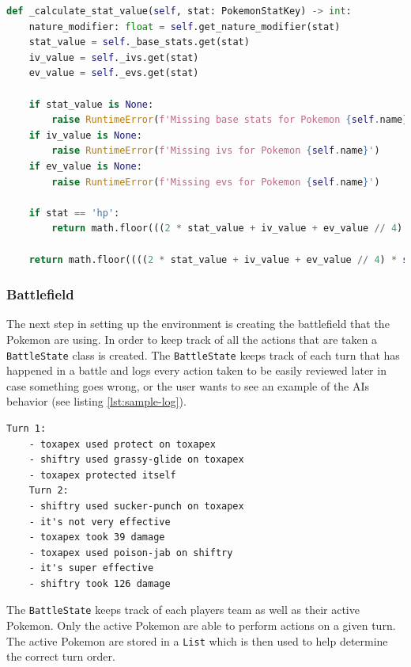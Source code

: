 \begin{lstlisting}[language=Python,caption={Function for calculating a Pokemon's stats},float=h,label=lst:stat-calc,breaklines]
def _calculate_stat_value(self, stat: PokemonStatKey) -> int:
    nature_modifier: float = self.get_nature_modifier(stat)
    stat_value = self._base_stats.get(stat)
    iv_value = self._ivs.get(stat)
    ev_value = self._evs.get(stat)

    if stat_value is None:
        raise RuntimeError(f'Missing base stats for Pokemon {self.name}')
    if iv_value is None:
        raise RuntimeError(f'Missing ivs for Pokemon {self.name}')
    if ev_value is None:
        raise RuntimeError(f'Missing evs for Pokemon {self.name}')

    if stat == 'hp':
        return math.floor(((2 * stat_value + iv_value + ev_value // 4) * self.level // 100) + self.level + 10)

    return math.floor((((2 * stat_value + iv_value + ev_value // 4) * self.level // 100) + 5) * nature_modifier)
\end{lstlisting}

\subsubsection{Battlefield}
The next step in setting up the environment is creating the battlefield that the Pokemon are using. In order to keep track
of all the actions that are taken a \lstinline|BattleState| class is created. The \lstinline|BattleState| keeps track of
each turn that has happened in a battle and logs every action taken to be easily reviewed later in case something goes wrong,
or the user wants to see an example of the AIs behavior (see listing \ref{lst:sample-log}).
\begin{lstlisting}[caption={Sample log from an episode},float=h,label=lst:sample-log,breaklines]
    Turn 1:
    - toxapex used protect on toxapex
    - shiftry used grassy-glide on toxapex
    - toxapex protected itself
    Turn 2:
    - shiftry used sucker-punch on toxapex
    - it's not very effective
    - toxapex took 39 damage
    - toxapex used poison-jab on shiftry
    - it's super effective
    - shiftry took 126 damage
\end{lstlisting}

The \lstinline|BattleState| keeps track of each players team as well as their active Pokemon. Only the active Pokemon are able to
perform actions on a given turn. The active Pokemon are stored in a \lstinline|List| which is then used to help determine
the correct turn order.

